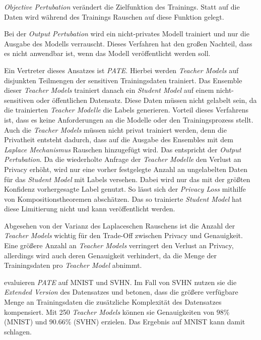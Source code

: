 \textit{Objective Pertubation} verändert die Zielfunktion des Trainings. Statt auf die Daten wird während des Trainings Rauschen auf diese Funktion gelegt.

Bei der \textit{Output Pertubation} wird ein nicht-privates Modell trainiert und nur die Ausgabe des Modells verrauscht. Dieses Verfahren hat den großen Nachteil, dass es nicht anwendbar ist, wenn das Modell veröffentlicht werden soll.

Ein Vertreter dieses Ansatzes ist \textit{PATE}\cite{papernot:2017}. Hierbei werden \textit{Teacher Models} auf disjunkten Teilmengen der sensitiven Trainingsdaten trainiert. Das Ensemble dieser \textit{Teacher Models} trainiert danach ein \textit{Student Model} auf einem nicht-sensitiven oder öffentlichen Datensatz. Diese Daten müssen nicht gelabelt sein, da die trainierten \textit{Teacher Modelle} die Labels generieren. Vorteil dieses Verfahrens ist, dass es keine Anforderungen an die Modelle oder den Trainingsprozess stellt. Auch die \textit{Teacher Models} müssen nicht privat trainiert werden, denn die Privatheit entsteht dadurch, dass auf die Ausgabe des Ensembles mit dem \textit{Laplace Mechanismus} Rauschen hinzugefügt wird. Das entspricht der \textit{Output Pertubation}. Da die wiederholte Anfrage der \textit{Teacher Modelle} den Verlust an Privacy erhöht, wird nur eine vorher festgelegte Anzahl an ungelabelten Daten für das \textit{Student Model} mit Labels versehen. Dabei wird nur das mit der größten Konfidenz vorhergesagte Label genutzt. So lässt sich der \textit{Privacy Loss} mithilfe von Kompositionstheoremen abschätzen. Das so trainierte \textit{Student Model} hat diese Limitierung nicht und kann veröffentlicht werden.

Abgesehen von der Varianz des Laplaceschen Rauschens ist die Anzahl der \textit{Teacher Models} wichtig für den Trade-Off zwischen Privacy und Genauigkeit. Eine größere Anzahl an \textit{Teacher Models} verringert den Verlust an Privacy, allerdings wird auch deren Genauigkeit verhindert, da die Menge der Trainingsdaten pro \textit{Teacher Model} abnimmt.

\textcite{papernot:2017} evaluieren \textit{PATE} auf MNIST und SVHN. Im Fall von SVHN nutzen sie die \textit{Extended Version} des Datensatzes und betonen, dass die größere verfügbare Menge an Trainingsdaten die zusätzliche Komplexität des Datensatzes kompensiert. Mit 250 \textit{Teacher Models} können sie Genauigkeiten von $98\%$ (MNIST) und $90.66\%$ (SVHN) erzielen. Das Ergebnis auf MNIST kann damit \textcite{abadi:2016} schlagen.

